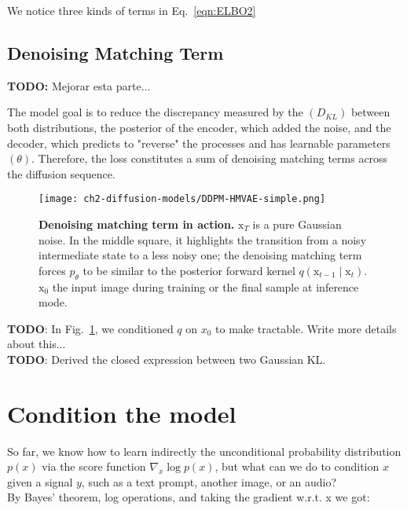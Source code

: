     We notice three kinds of terms in Eq.~\ref{eqn:ELBO2}

\subsection{Denoising Matching Term}

\textbf{TODO:} Mejorar esta parte...

The model goal is to reduce the discrepancy measured by the $(D_{KL})$ between both distributions, the posterior of the encoder, which added the noise, and the decoder, which predicts to "reverse" the processes and has learnable parameters $(\theta)$. Therefore, the loss constitutes a sum of denoising matching terms across the diffusion sequence.

\begin{figure}[ht]
  \centering
  \texttt{[image: ch2-diffusion-models/DDPM-HMVAE-simple.png]}
  \captionsetup{width=\textwidth} %
  \caption{\textbf{Denoising matching term in action.} $\mathrm{x}_{T}$ is a pure Gaussian noise. In the middle square, it highlights the transition from a noisy intermediate state to a less noisy one; the denoising matching term forces $p_{\theta}$ to be similar to the posterior forward kernel $q(\mathrm{x}_{t-1}\mid \mathrm{x}_{t})$. $\mathrm{x}_{0}$ the input image during training or the final sample at inference mode. }
  \label{fig:ddpm-denoising-term}
\end{figure}

\textbf{TODO}: In Fig.~\ref{fig:ddpm-denoising-term}, we conditioned $q$ on $x_{0}$ to make tractable. Write more details about this...\\

\textbf{TODO}: Derived the closed expression between two Gaussian KL.
    
\section{Condition the model}

So far, we know how to learn indirectly the unconditional probability distribution $p(x)$ via the score function $\nabla_{x}\log p(x)$, but what can we do to condition $x$ given a signal $y$, such as a text prompt, another image, or an audio?\\

By Bayes' theorem, log operations, and taking the gradient w.r.t. x we got:

